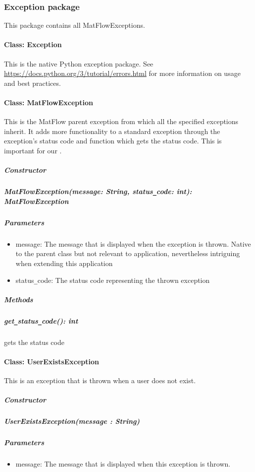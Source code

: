 \subsubsection{Exception package}

This package contains all MatFlowExceptions.

\paragraph{Class: Exception}
This is the native Python exception package. See \url{https://docs.python.org/3/tutorial/errors.html} 
for more information on usage and best practices.

\paragraph{Class: MatFlowException}
This is the MatFlow parent exception from which all the specified exceptions inherit. It adds more functionality to 
a standard exception through the exception's status code and function which gets the status code. This is important for our
.
\subparagraph{Constructor}
\subparagraph{MatFlowException(message: String, status\texttt{\_}code: int): MatFlowException}
\subparagraph{Parameters}
\begin{itemize}
	\item{message:}
	The message that is displayed when the exception is thrown. Native to the parent class but not relevant to application,
    nevertheless intriguing when extending this application 
    \item{status\texttt{\_}code:}
	The status code representing the thrown exception
\end{itemize}

\subparagraph{Methods}
\subparagraph{get\texttt{\_}status\texttt{\_}code(): int}
gets the status code


\paragraph{Class: UserExistsException}
This is an exception that is thrown when a user does not exist.
\subparagraph{Constructor}

\subparagraph{UserExistsException(message : String)}
\subparagraph{Parameters}
\begin{itemize}
    \item{message:}
    The message that is displayed when this exception is thrown.
\end{itemize}


